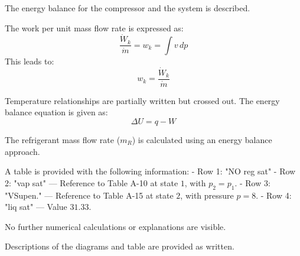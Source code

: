 The energy balance for the compressor and the system is described.  

The work per unit mass flow rate is expressed as:  
\[
\frac{\dot{W}_k}{\dot{m}} = w_k = \int v \, dp
\]  
This leads to:  
\[
w_k = \frac{\dot{W}_k}{\dot{m}}
\]  

Temperature relationships are partially written but crossed out. The energy balance equation is given as:  
\[
\Delta U = q - W
\]

The refrigerant mass flow rate (\(m_R\)) is calculated using an energy balance approach.  

A table is provided with the following information:  
- Row 1: "NO reg sat"  
- Row 2: "vap sat" — Reference to Table A-10 at state \(1\), with \(p_2 = p_1\).  
- Row 3: "VSupen." — Reference to Table A-15 at state \(2\), with pressure \(p = 8\).  
- Row 4: "liq sat" — Value \(31.33\).  

No further numerical calculations or explanations are visible.  

Descriptions of the diagrams and table are provided as written.